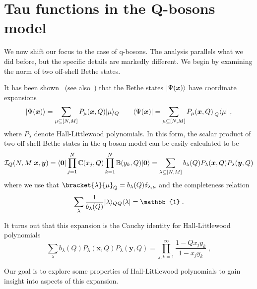 \documentclass[a4paper,11pt]{amsart}
\begin{document}
\section{Tau functions in the Q-bosons model}

We now shift our focus to the case of q-bosons. The analysis parallels
what we did before, but the specific details are markedly
different. We begin by examining the norm of two off-shell Bethe
states.

It has been shown~\cite{Tsilevich:2006} (see
also~\cite{Sulkowski:2008mx, Wheeler:2010vmq}) that the Bethe states
\(\lvert\Psi(\bm{x})\rangle\) have coordinate expansions
\begin{equation}
  \lvert\Psi(\bm{x})\rangle = \sum_{\mu \subseteq [N,M]} P_\mu(\bm{x}, Q) \lvert\mu\rangle_Q  \qquad 
  \langle\Psi(\bm{x})\rvert = \sum_{\mu \subseteq [N,M]} P_\mu(\bm{x}, Q) \prescript{}{Q}{\langle\mu\rvert}\; ,
\end{equation}
where \(P_\lambda\) denote Hall-Littlewood polynomials. In this form,
the scalar product of two off-shell Bethe states in the q-boson model
can be easily calculated to be
\begin{equation}
\label{eq:scalar-hl}
\mathcal{I}_Q(N,M | \bm{x}, \bm{y}) = \langle\bm{0}\rvert \prod_{j=1}^N \mathbb{C}(x_j, Q)
\prod_{k=1}^N \mathbb{B}(y_k, Q) \lvert\bm{0}\rangle
= \sum_{\lambda \subseteq [N,M]} b_\lambda(Q) P_{\lambda}(\bm{x}, Q) P_{\lambda}(\bm{y}, Q)
\end{equation}
where we use that \(\bracket{\lambda}{\mu}_Q = b_\lambda(Q)
\delta_{\lambda, \mu}\) and the completeness relation
\begin{equation}
  \sum_{\lambda} \frac{1}{b_\lambda(Q)} \ket{\lambda}_Q {}_Q\bra{\lambda}  = \mathbb{1}\; .
\end{equation}

It turns out that this expansion is the Cauchy identity for
Hall-Littlewood polynomials~\cite{Macdonald:1998}
\begin{equation}
\label{eq:cauchy_hl}
\sum_{\lambda} b_\lambda(Q) P_{\lambda}(\bm{x}, Q) P_{\lambda}(\bm{y}, Q)
= \prod_{j, k=1}^\infty \frac{1-Q x_j y_k}{1 - x_j y_k}\; ,
\end{equation}

Our goal is to explore some properties of Hall-Littlewood polynomials
to gain insight into aspects of this expansion.

\end{document}
